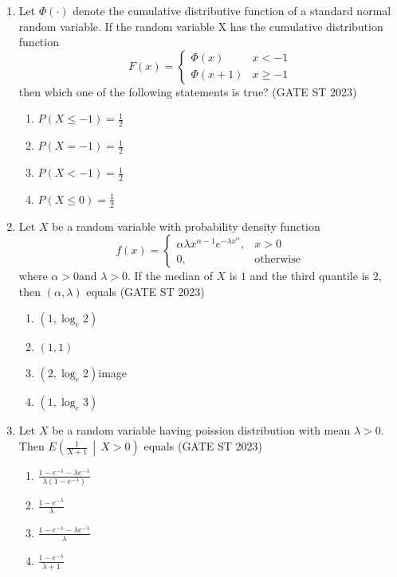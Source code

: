 \documentclass[journal]{IEEEtran}
\begin{document}
\begin{enumerate}[label=\textbf{Q.\arabic*.}, start=1, align=left, itemsep=2em]
\begin{enumerate}[label=\textbf{Q.\arabic*.}, start=11, align=left, itemsep=2em]
\item Let $\Phi(\cdot)$ denote the cumulative distributive function of a standard normal random variable. If the random variable X has the cumulative distribution function  
\[
F(x) =
\begin{cases}
\Phi(x) & x < -1 \\
\Phi(x + 1) & x \ge -1
\end{cases}
\]
then which one of the following statements is true? \hfill(GATE ST 2023) 
\begin{enumerate}[label=(\Alph*)]
    \item $P(X \le -1) = \frac{1}{2}$
    \item $P(X = -1) = \frac{1}{2}$
    \item $P(X < -1) = \frac{1}{2}$
    \item $P(X \le 0) = \frac{1}{2}$
\end{enumerate}

\item Let $X$ be a random variable with probability density function
\[ f(x) = \begin{cases}
\alpha \lambda x^{\alpha - 1} e^{ - \lambda x^{\alpha}}, & x>0 \\
0, & \text{otherwise}
\end{cases} \]
where $\alpha > 0$and $\lambda > 0$. If the median of $X$ is $1$ and the third quantile is $2$, then $(\alpha, \lambda)$ equals \hfill(GATE ST 2023) 
\begin{enumerate}[label=(\Alph*)]
    \item $(1, \log_e 2)$
    \item $(1, 1)$
    \item $(2, \log_e 2)$image
    \item $(1, \log_e 3)$
\end{enumerate}

\item Let $X$ be a random variable having poission distribution with mean $\lambda > 0$. Then $E\left( \frac{1}{X+1} \,\middle|\, X > 0\right)$ equals  \hfill(GATE ST 2023)
\begin{enumerate}[label=(\Alph*)]
    \item $\frac{1 - e^{-\lambda} - \lambda e^{-\lambda}}{\lambda (1 - e^{-\lambda})}$
    \item $\frac{1 - e^{-\lambda}}{\lambda}$
    \item $\frac{1 - e^{-\lambda} - \lambda e^{-\lambda}}{\lambda}$
    \item $\frac{1 - e^{-\lambda}}{\lambda + 1}$
\end{enumerate}


\end{enumerate}
\end{enumerate}
\end{document}
